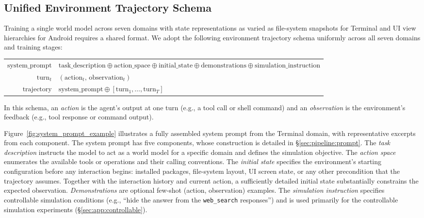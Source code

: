 \documentclass{llmxive}
\begin{document}
\subsection{Unified Environment Trajectory Schema}
\label{sec:prelim:schema}

Training a single world model across seven domains with state representations as varied as file-system snapshots for Terminal and UI view hierarchies for Android requires a shared format.
We adopt the following environment trajectory schema uniformly across all seven domains and training stages:

\begin{tcolorbox}[
  colback=gray!3, colframe=black!50,
  boxrule=0.5pt, arc=2pt,
  title={\small\bfseries Unified Environment Trajectory Schema},
  top=4pt, bottom=4pt, left=6pt, right=6pt
]
\small
\begin{tabular}{@{}r@{$\;\,:=\;\,$}l@{}}
$\mathrm{system\_prompt}$ & $\mathrm{task\_description} \oplus \mathrm{action\_space} \oplus \mathrm{initial\_state} \oplus \mathrm{demonstrations} \oplus \mathrm{simulation\_instruction}$ \\[4pt]
$\mathrm{turn}_t$ & $(\mathrm{action}_t,\,\mathrm{observation}_t)$ \\[4pt]
$\mathrm{trajectory}$ & $\mathrm{system\_prompt} \oplus [\mathrm{turn}_1, \ldots, \mathrm{turn}_T]$
\end{tabular}
\end{tcolorbox}

In this schema, an \emph{action} is the agent's output at one turn (e.g., a tool call or shell command) and an \emph{observation} is the environment's feedback (e.g., tool response or command output).

Figure~\ref{fig:system_prompt_example} illustrates a fully assembled system prompt from the Terminal domain, with representative excerpts from each component.
The system prompt has five components, whose construction is detailed in \S\ref{sec:pipeline:prompt}.
The \emph{task description} instructs the model to act as a world model for a specific domain and defines the simulation objective.
The \emph{action space} enumerates the available tools or operations and their calling conventions.
The \emph{initial state} specifies the environment's starting configuration before any interaction begins: installed packages, file-system layout, UI screen state, or any other precondition that the trajectory assumes.
Together with the interaction history and current action, a sufficiently detailed initial state substantially constrains the expected observation.
\emph{Demonstrations} are optional few-shot (action, observation) examples.
The \emph{simulation instruction} specifies controllable simulation conditions (e.g., ``hide the answer from the \texttt{web\_search} responses'') and is used primarily for the controllable simulation experiments (\S\ref{sec:app:controllable}).
\end{document}
